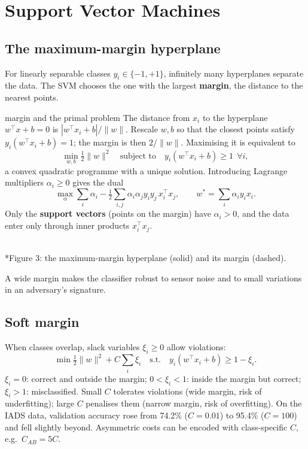 \documentclass[11pt]{article}
\begin{document}
\section{Support Vector Machines}
\subsection{The maximum-margin hyperplane}
For linearly separable classes $y_i\in\{-1,+1\}$, infinitely many hyperplanes separate the data. The SVM chooses the one with the largest \textbf{margin}, the distance to the nearest points.
\begin{derivation}{margin and the primal problem}
The distance from $x_i$ to the hyperplane $w^\top x+b=0$ is $|w^\top x_i+b|/\|w\|$. Rescale $w,b$ so that the closest points satisfy $y_i(w^\top x_i+b)=1$; the margin is then $2/\|w\|$. Maximising it is equivalent to
\[\min_{w,b}\tfrac12\|w\|^2\quad\text{subject to}\quad y_i(w^\top x_i+b)\ge1\ \ \forall i,\]
a convex quadratic programme with a unique solution. Introducing Lagrange multipliers $\alpha_i\ge0$ gives the dual
\[\max_\alpha\sum_i\alpha_i-\tfrac12\sum_{i,j}\alpha_i\alpha_jy_iy_j\,x_i^\top x_j,\qquad w^*=\sum_i\alpha_iy_ix_i.\]
Only the \textbf{support vectors} (points on the margin) have $\alpha_i>0$, and the data enter only through inner products $x_i^\top x_j$.
\end{derivation}
\begin{center}\\*{\small\color{GreyN}Figure 3: the maximum-margin hyperplane (solid) and its margin (dashed).}\end{center}
A wide margin makes the classifier robust to sensor noise and to small variations in an adversary's signature.

\subsection{Soft margin}
When classes overlap, slack variables $\xi_i\ge0$ allow violations:
\[\min\tfrac12\|w\|^2+C\sum_i\xi_i\quad\text{s.t.}\quad y_i(w^\top x_i+b)\ge1-\xi_i.\]
$\xi_i=0$: correct and outside the margin; $0<\xi_i<1$: inside the margin but correct; $\xi_i>1$: misclassified. Small $C$ tolerates violations (wide margin, risk of underfitting); large $C$ penalises them (narrow margin, risk of overfitting). On the IADS data, validation accuracy rose from 74.2\% ($C=0.01$) to 95.4\% ($C=100$) and fell slightly beyond. Asymmetric costs can be encoded with class-specific $C$, e.g.\ $C_{AB}=5C$.
\end{document}
